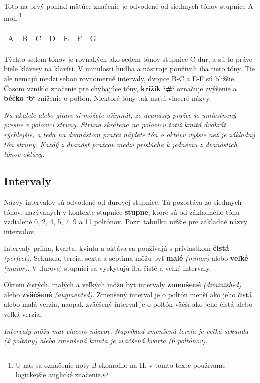Toto na prvý pohľad mätúce značenie je odvodené od siedmych tónov stupnice A moll:\footnote{U nás sa označenie noty B skomolilo na H, v tomto texte používame logickejšie anglické značenie.}

\begin{center}
\begin{tabular}{ C{2em} C{2em} C{2em} C{2em} C{2em} C{2em} C{2em} }
    A & B & C & D & E & F & G \\
\end{tabular}
\end{center}

Týchto sedem tónov je rovnakých ako sedem tónov stupnice C dur, a sú to práve biele klávesy na klavíri.
V minulosti hudba a nástroje používali iba tieto tóny. Tie ale nemajú medzi sebou rovnomerné
intervaly, dvojice B-C a E-F sú bližšie. Časom vzniklo značenie pre chýbajúce tóny,
\textbf{krížik `\#`} označuje zvýšenie a \textbf{béčko `b`} zníženie o poltón. Niektoré tóny tak majú
viaceré názvy.

\textit{%
Na ukulele alebo gitare si môžete všimnúť, že dvanásty pražec je umiestnený presne v polovici struny.
Struna skrátena na polovicu totiž kmitá dvakrát rýchlejšie, a teda na dvanástom pražci nájdete tón
o oktávu vyšsie než je základný tón struny. Každý z dvanásť pražcov medzi prislúcha k jednému z dvanástich tónov
oktávy.
}


\subsection*{Intervaly}

Názvy intervalov sú odvodené od durovej stupnice. Tá pozostáva zo siedmych tónov, nazývaných
v kontexte stupnice \textbf{stupne}, ktoré sú od základného tónu vzdialené 0, 2, 4, 5, 7, 9 a 11
poltónov. Pozri tabuľku nižšie pre základné názvy intervalov.

Intervaly príma, kvarta, kvinta a oktáva sa používajú s prívlastkom \textbf{čistá} \textit{(perfect)}.
Sekunda, tercia, sexta a septima môžu byť \textbf{malé} \textit{(minor)} alebo \textbf{veľké}
\textit{(major)}. V durovej stupnici sa vyskytujú iba čisté a veľké intervaly.

Okrem čistých, malých a veľkých môžu byť intervaly \textbf{zmenšené} \textit{(diminished)} alebo
\textbf{zväčšené} \textit{(augmented)}. Zmenšený interval je o poltón menší ako jeho čistá alebo
malá verzia, naopak zväčšený interval je o poltón väčší ako jeho čistá alebo veľká verzia.

\textit{%
Intervaly môžu mať viacero názvov. Napríklad zmenšená tercia je veľká sekunda (2 poltóny) alebo
zmenšená kvinta je zväčšená kvarta (6 poltónov).
}



